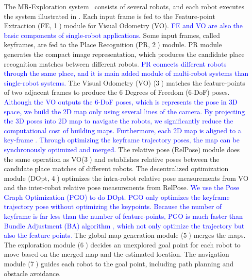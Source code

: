 The MR-Exploration system~\cite{corah2019communication, cieslewski2018data} consists of several robots, and each robot executes the system illustrated in . Each input frame is fed to the Feature-point Extraction (FE, \textcircled{1}) module for Visual Odometry (VO). 
\textcolor{blue}{
FE and VO are also the basic components of single-robot applications.
}
Some input frames, called keyframes, are fed to the Place Recognition (PR, \textcircled{2}) module.
PR module generates the compact image representation, which produces the candidate place recognition matches between different robots.
\textcolor{blue}{
PR connects different robots through the same place, and it is main added module of multi-robot systems than single-robot systems.
}
The Visual Odometry (VO) (\textcircled{3}) matches the feature-points of two adjacent frames to produce the 6 Degrees of Freedom (6-DoF) poses. 
\textcolor{blue}{
Although the VO outputs the 6-DoF poses, which is represents the pose in 3D space, we build the 2D map only using several lines of the camera. 
By projecting the 3D poses into 2D map to navigate the robots, we significantly reduce the computational cost of building maps.
Furthermore, each 2D map is aligned to a key-frame \cite{ho2018virtual,sodhi2019online}.
Through optimizing the keyframe trajectory poses, the map can be synchronously optimized and merged.
}
The relative pose (RelPose) module does the same operation as VO(\textcircled{3}) and establishes relative poses between the candidate place matches of different robots. 
The decentralized optimization module (DOpt, \textcircled{4}) optimizes the intra-robot relative pose measurements from VO and the inter-robot relative pose measurements from RelPose. 
\textcolor{blue}{
We use the Pose Graph Optimization (PGO) \cite{Choudhary:2017e66} to do DOpt. 
PGO only optimizes the keyframe trajectory pose without optimizing the keypoints. 
Because the number of keyframe is far less than the number of feature-points, PGO is much faster than Bundle Adjustment (BA) algorithm \cite{wu2011multicore}, which not only optimize the trajectory but also the feature-points.
}
The global map generation module (\textcircled{5}) merges the maps. The exploration module (\textcircled{6}) decides an unexplored goal point for each robot to move based on the merged map and the estimated location. The navigation module (\textcircled{7}) guides each robot to the goal point, including path planning and obstacle avoidance.

